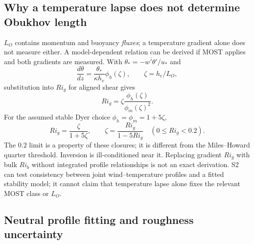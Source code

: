 \subsection{Why a temperature lapse does not determine Obukhov length}

$L_O$ contains momentum and buoyancy \emph{fluxes}; a temperature gradient
alone does not measure either. A model-dependent relation can be derived
if MOST applies and both gradients are measured. With
$\theta_*=-\overline{w'\theta'}/u_*$ and
\begin{equation}
 \frac{d\theta}{dz}=\frac{\theta_*}{\kappa h_e}\phi_h(\zeta),
 \qquad \zeta=h_e/L_O,
\end{equation}
substitution into $Ri_g$ for aligned shear gives
\begin{equation}
 Ri_g=\zeta\frac{\phi_h(\zeta)}{\phi_m(\zeta)^2}.
\end{equation}
For the assumed stable Dyer choice $\phi_h=\phi_m=1+5\zeta$,
\begin{equation}
 Ri_g=\frac{\zeta}{1+5\zeta},\qquad
 \zeta=\frac{Ri_g}{1-5Ri_g}\quad(0\leq Ri_g<0.2).
\end{equation}
The $0.2$ limit is a property of these closures; it is different from the
Miles--Howard quarter threshold. Inversion is ill-conditioned near it.
Replacing gradient $Ri_g$ with bulk $Ri_b$ without integrated profile
relationships is not an exact derivation. S2 can test consistency between
joint wind--temperature profiles and a fitted stability model; it cannot
claim that temperature lapse alone fixes the relevant MOST class or $L_O$.

\subsection{Neutral profile fitting and roughness uncertainty}

